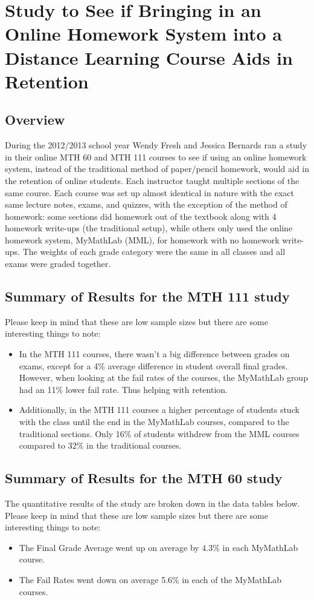 \chapter[Do online homework systems aid retention?]{Study to See if Bringing in an Online Homework System into a Distance Learning Course Aids in Retention}
\label{app:sec:onlinehwstudy}

\section{Overview}
During the 2012/2013 school year Wendy Fresh and Jessica Bernards ran a study in their online MTH 60 and MTH 111 courses to see if using an online homework system, instead of the traditional method of paper/pencil homework, would aid in the retention of online students.  Each instructor taught multiple sections of the same course.  Each course was set up almost identical in nature with the exact same lecture notes, exams, and quizzes, with the exception of the method of homework: some sections did homework out of the textbook along with 4 homework write-ups (the traditional setup), while others only used the online homework system, MyMathLab (MML), for homework with no homework write-ups.  The weights of each grade category were the same in all classes and all exams were graded together.

\section{Summary of Results for the MTH 111 study}
Please keep in mind that these are low sample sizes but there are some interesting things to note: 
\begin{itemize}
  \item In the MTH 111 courses, there wasn’t a big difference between grades on exams, except for a 4\% average difference in student overall final grades.  However, when looking at the fail rates of the courses, the MyMathLab group had an 11\% lower fail rate.  Thus helping with retention.
  \item Additionally, in the MTH 111 courses a higher percentage of students stuck with the class until the end in the MyMathLab courses, compared to the traditional sections.  Only 16\% of students withdrew from the MML courses compared to 32\% in the traditional courses.  
\end{itemize}

\section{Summary of Results for the MTH 60 study}
The quantitative results of the study are broken down in the data tables below.  Please keep in mind that these are low sample sizes but there are some interesting things to note: 
\begin{itemize}
  \item The Final Grade Average went up on average by 4.3\% in each MyMathLab course. 
  \item The Fail Rates went down on average 5.6\% in each of the MyMathLab courses.
\end{itemize}

